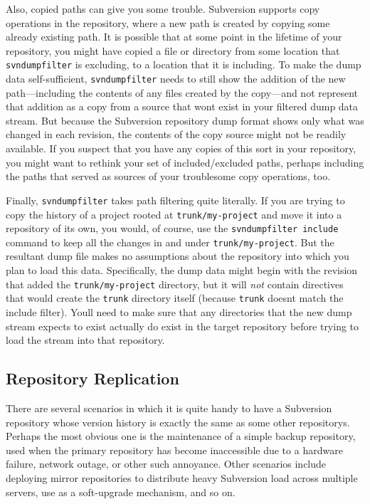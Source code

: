 Also, copied paths can give you some trouble. Subversion supports copy
operations in the repository, where a new path is created by copying
some already existing path. It is possible that at some point in the
lifetime of your repository, you might have copied a file or directory
from some location that \texttt{svndumpfilter} is excluding, to a
location that it is including. To make the dump data self-sufficient,
\texttt{svndumpfilter} needs to still show the addition of the new
path---including the contents of any files created by the copy---and not
represent that addition as a copy from a source that
won\textquotesingle t exist in your filtered dump data stream. But
because the Subversion repository dump format shows only what was
changed in each revision, the contents of the copy source might not be
readily available. If you suspect that you have any copies of this sort
in your repository, you might want to rethink your set of
included/excluded paths, perhaps including the paths that served as
sources of your troublesome copy operations, too.

Finally, \texttt{svndumpfilter} takes path filtering quite literally. If
you are trying to copy the history of a project rooted at
\texttt{trunk/my-project} and move it into a repository of its own, you
would, of course, use the \texttt{svndumpfilter\ include} command to
keep all the changes in and under \texttt{trunk/my-project}. But the
resultant dump file makes no assumptions about the repository into which
you plan to load this data. Specifically, the dump data might begin with
the revision that added the \texttt{trunk/my-project} directory, but it
will \emph{not} contain directives that would create the \texttt{trunk}
directory itself (because \texttt{trunk} doesn\textquotesingle t match
the include filter). You\textquotesingle ll need to make sure that any
directories that the new dump stream expects to exist actually do exist
in the target repository before trying to load the stream into that
repository.

\subsection{Repository
Replication}\label{svn.reposadmin.maint.replication}

There are several scenarios in which it is quite handy to have a
Subversion repository whose version history is exactly the same as some
other repository\textquotesingle s. Perhaps the most obvious one is the
maintenance of a simple backup repository, used when the primary
repository has become inaccessible due to a hardware failure, network
outage, or other such annoyance. Other scenarios include deploying
mirror repositories to distribute heavy Subversion load across multiple
servers, use as a soft-upgrade mechanism, and so on.

